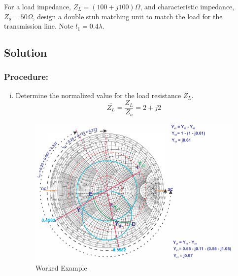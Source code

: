 \begin{exmp}
For a load impedance, $Z_{L} = (100 + j100)\Omega$, and characteristic impedance, $Z_{o} = 50\Omega$,  design a double stub matching unit to match the load for the transmission line. Note $l_{1} = 0.4\lambda$.

\subsection*{Solution}			
\subsubsection*{Procedure:}
\begin{enumerate}[(i)]
\item Determine the normalized value for the load resistance $Z_{L}$.
\begin{dmath*}
\bar{Z_{L}} = \frac{Z_{L}}{Z_{o}} = 2 + j2
\end{dmath*}
\begin{figure}[h]
\centering
\includegraphics[width=1\linewidth]{./graphics/question1}
\caption{Worked Example}
\label{fig:question1}
\end{figure}


\end{enumerate}
\end{exmp}
